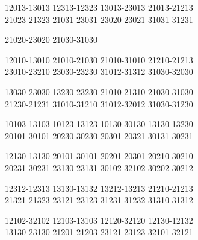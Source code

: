 \begingroup\footnotesize\ttfamily\begin{flushleft}
12013-13013 12313-12323 13013-23013 21013-21213\\
21023-21323 21031-23031 23020-23021 31031-31231\\
\end{flushleft}\endgroup
\begingroup\footnotesize\ttfamily\begin{flushleft}
21020-23020 21030-31030\\
\end{flushleft}\endgroup
\begingroup\footnotesize\ttfamily\begin{flushleft}
12010-13010 21010-21030 21010-31010 21210-21213\\
23010-23210 23030-23230 31012-31312 31030-32030\\
\end{flushleft}\endgroup
\begingroup\footnotesize\ttfamily\begin{flushleft}
13030-23030 13230-23230 21010-21310 21030-31030\\
21230-21231 31010-31210 31012-32012 31030-31230\\
\end{flushleft}\endgroup
\begingroup\footnotesize\ttfamily\begin{flushleft}
10103-13103 10123-13123 10130-30130 13130-13230\\
20101-30101 20230-30230 20301-20321 30131-30231\\
\end{flushleft}\endgroup
\begingroup\footnotesize\ttfamily\begin{flushleft}
12130-13130 20101-30101 20201-20301 20210-30210\\
20231-30231 23130-23131 30102-32102 30202-30212\\
\end{flushleft}\endgroup
\begingroup\footnotesize\ttfamily\begin{flushleft}
12312-12313 13130-13132 13212-13213 21210-21213\\
21321-21323 23121-23123 31231-31232 31310-31312\\
\end{flushleft}\endgroup
\begingroup\footnotesize\ttfamily\begin{flushleft}
12102-32102 12103-13103 12120-32120 12130-12132\\
13130-23130 21201-21203 23121-23123 32101-32121\\
\end{flushleft}\endgroup
